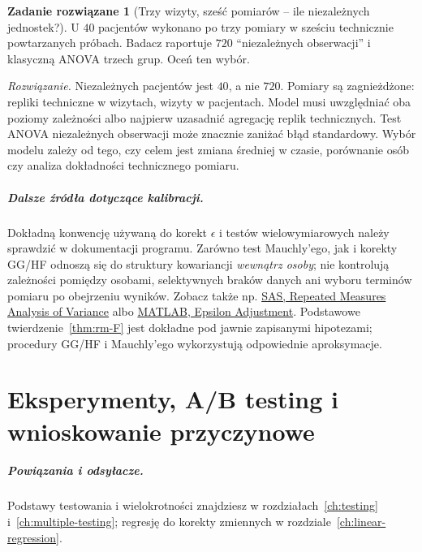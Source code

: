 \documentclass[11pt,a4paper,oneside]{report}
\numberwithin{equation}{chapter}
\theoremstyle{plain}
\theoremstyle{definition}
\newtheorem{zadanie}{Zadanie rozwiązane}[chapter]
\theoremstyle{remark}
\begin{document}
\begin{zadanie}[Trzy wizyty, sześć pomiarów -- ile niezależnych jednostek?]
U $40$ pacjentów wykonano po trzy pomiary w sześciu technicznie powtarzanych próbach. Badacz raportuje $720$ ``niezależnych obserwacji'' i klasyczną ANOVA trzech grup. Oceń ten wybór.\par
\emph{Rozwiązanie.} Niezależnych pacjentów jest $40$, a nie $720$. Pomiary są zagnieżdżone: repliki techniczne w wizytach, wizyty w pacjentach. Model musi uwzględniać oba poziomy zależności albo najpierw uzasadnić agregację replik technicznych. Test ANOVA niezależnych obserwacji może znacznie zaniżać błąd standardowy. Wybór modelu zależy od tego, czy celem jest zmiana średniej w czasie, porównanie osób czy analiza dokładności technicznego pomiaru.
\end{zadanie}

\paragraph{Dalsze źródła dotyczące kalibracji.}
Dokładną konwencję używaną do korekt $\epsilon$ i testów wielowymiarowych należy sprawdzić w dokumentacji programu. Zarówno test Mauchly'ego, jak i korekty GG/HF odnoszą się do struktury kowariancji \emph{wewnątrz osoby}; nie kontrolują zależności pomiędzy osobami, selektywnych braków danych ani wyboru terminów pomiaru po obejrzeniu wyników. Zobacz także np. \href{https://support.sas.com/documentation/cdl/en/statug/68162/HTML/default/statug_glm_details46.htm}{SAS, Repeated Measures Analysis of Variance} albo \href{https://www.mathworks.com/help/stats/repeatedmeasuresmodel.epsilon.html}{MATLAB, Epsilon Adjustment}. Podstawowe twierdzenie~\ref{thm:rm-F} jest dokładne pod jawnie zapisanymi hipotezami; procedury GG/HF i Mauchly'ego wykorzystują odpowiednie aproksymacje.

\chapter{Eksperymenty, A/B testing i wnioskowanie przyczynowe}
\label{ch:causal-ab}
\paragraph{Powiązania i odsyłacze.} Podstawy testowania i wielokrotności znajdziesz w rozdziałach~\ref{ch:testing} i~\ref{ch:multiple-testing}; regresję do korekty zmiennych w rozdziale~\ref{ch:linear-regression}.
\end{document}
